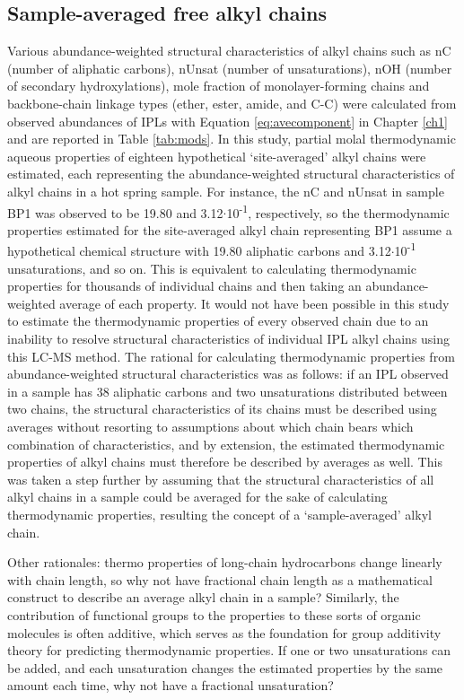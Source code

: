 \subsection{Sample-averaged free alkyl chains}
Various abundance-weighted structural characteristics of alkyl chains such as nC (number of aliphatic carbons), nUnsat (number of unsaturations), nOH (number of secondary hydroxylations), mole fraction of monolayer-forming chains and backbone-chain linkage types (ether, ester, amide, and C-C) were calculated from observed abundances of IPLs with Equation \ref{eq:avecomponent} in Chapter \ref{ch1} and are reported in Table \ref{tab:mods}. In this study, partial molal thermodynamic aqueous properties of eighteen hypothetical `site-averaged' alkyl chains were estimated, each representing the abundance-weighted structural characteristics of alkyl chains in a hot spring sample. For instance, the nC and nUnsat in sample BP1 was observed to be 19.80 and 3.12$\cdot$10\textsuperscript{-1}, respectively, so the thermodynamic properties estimated for the site-averaged alkyl chain representing BP1 assume a hypothetical chemical structure with 19.80 aliphatic carbons and 3.12$\cdot$10\textsuperscript{-1} unsaturations, and so on. This is equivalent to calculating thermodynamic properties for thousands of individual chains and then taking an abundance-weighted average of each property. It would not have been possible in this study to estimate the thermodynamic properties of every observed chain due to an inability to resolve structural characteristics of individual IPL alkyl chains using this LC-MS method. The rational for calculating thermodynamic properties from abundance-weighted structural characteristics was as follows: if an IPL observed in a sample has 38 aliphatic carbons and two unsaturations distributed between two chains, the structural characteristics of its chains must be described using averages without resorting to assumptions about which chain bears which combination of characteristics, and by extension, the estimated thermodynamic properties of alkyl chains must therefore be described by averages as well. This was taken a step further by assuming that the structural characteristics of all alkyl chains in a sample could be averaged for the sake of calculating thermodynamic properties, resulting the concept of a `sample-averaged' alkyl chain.

Other rationales: thermo properties of long-chain hydrocarbons change linearly with chain length, so why not have fractional chain length as a mathematical construct to describe an average alkyl chain in a sample? Similarly, the contribution of functional groups to the properties to these sorts of organic molecules is often additive, which serves as the foundation for group additivity theory for predicting thermodynamic properties. If one or two unsaturations can be added, and each unsaturation changes the estimated properties by the same amount each time, why not have a fractional unsaturation?

